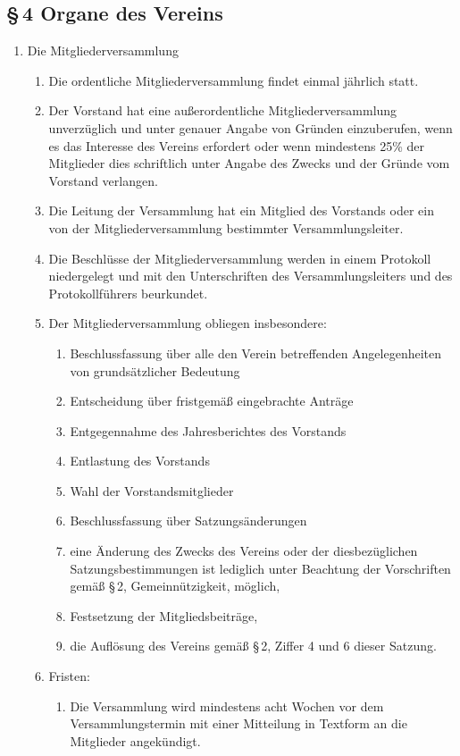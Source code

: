 \documentclass[12pt,a4paper]{article}
\begin{document}
\subsection*{§\,4 Organe des Vereins}
\begin{enumerate}
\item Die Mitgliederversammlung
\begin{enumerate}
\item Die ordentliche Mitgliederversammlung findet einmal jährlich statt.
\item Der Vorstand hat eine außerordentliche Mitgliederversammlung unverzüglich und unter genauer Angabe von Gründen einzuberufen, wenn es das Interesse des Vereins erfordert oder wenn mindestens 25\% der Mitglieder dies schriftlich unter Angabe des Zwecks und der Gründe vom Vorstand verlangen.
\item Die Leitung der Versammlung hat ein Mitglied des Vorstands oder ein von der Mitgliederversammlung bestimmter Versammlungsleiter.
\item Die Beschlüsse der Mitgliederversammlung werden in einem Protokoll niedergelegt und mit den Unterschriften des Versammlungsleiters und des Protokollführers beurkundet.
\item Der Mitgliederversammlung obliegen insbesondere:
\begin{enumerate}
\item Beschlussfassung über alle den Verein betreffenden Angelegenheiten von grundsätzlicher Bedeutung
\item Entscheidung über fristgemäß eingebrachte Anträge
\item Entgegennahme des Jahresberichtes des Vorstands
\item Entlastung des Vorstands
\item Wahl der Vorstandsmitglieder
\item Beschlussfassung über Satzungsänderungen
\item eine Änderung des Zwecks des Vereins oder der diesbezüglichen Satzungsbestimmungen ist lediglich unter Beachtung der Vorschriften gemäß §\,2, Gemeinnützigkeit, möglich,
\item Festsetzung der Mitgliedsbeiträge, 
\item die Auflösung des Vereins gemäß §\,2, Ziffer 4 und 6 dieser Satzung.
\end{enumerate}
\item Fristen: 
\begin{enumerate}
\item Die Versammlung wird mindestens acht Wochen vor dem Versammlungstermin mit einer Mitteilung in Textform an die Mitglieder angekündigt.

\end{enumerate}
\end{enumerate}
\end{enumerate}
\end{document}
